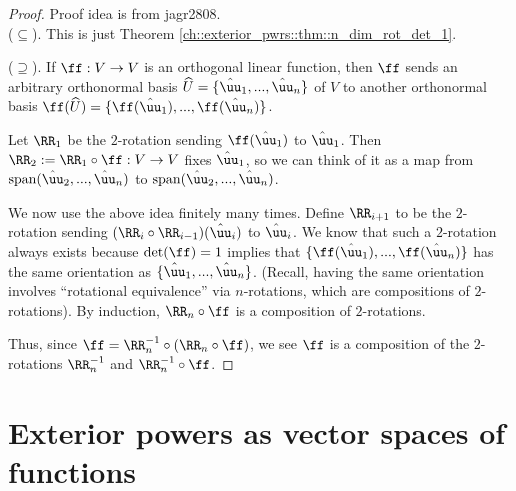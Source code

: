 \begin{proof}
    \scriptsize Proof idea is from jagr2808. 
    \fontsize{10pt}{12pt}\selectfont \\
    \indent ($\subseteq$). This is just Theorem \ref{ch::exterior_pwrs::thm::n_dim_rot_det_1}.
    
    \indent ($\supseteq$). If $\ff:V \rightarrow V$ is an orthogonal linear function, then $\ff$ sends an arbitrary orthonormal basis $\hU = \{\huu_1, ..., \huu_n\}$ of $V$ to another orthonormal basis $\ff(\hU) = \{\ff(\huu_1), ..., \ff(\huu_n)\}$.

    Let $\RR_1$ be the $2$-rotation sending $\ff(\huu_1)$ to $\huu_1$. Then $\RR_2 := \RR_1 \circ \ff:V \rightarrow V$ fixes $\huu_1$, so we can think of it as a map from $\spann(\huu_2, ..., \huu_n)$ to $\spann(\huu_2, ..., \huu_n)$. 
    
    We now use the above idea finitely many times. Define $\RR_{i + 1}$ to be the $2$-rotation sending ${(\RR_i \circ \RR_{i - 1})(\huu_i)}$ to $\huu_i$. We know that such a $2$-rotation always exists because $\det(\ff) = 1$ implies that $\{\ff(\huu_1), ..., \ff(\huu_n)\}$ has the same orientation as $\{\huu_1, ..., \huu_n\}$. (Recall, having the same orientation involves ``rotational equivalence'' via $n$-rotations, which are compositions of $2$-rotations). By induction, $\RR_n \circ \ff$ is a composition of $2$-rotations.
    
    Thus, since $\ff = \RR_n^{-1} \circ (\RR_n \circ \ff)$, we see $\ff$ is a composition of the $2$-rotations $\RR_n^{-1}$ and $\RR_n^{-1} \circ \ff$.
    

\end{proof}

\newpage

\section{Exterior powers as vector spaces of functions}

    
